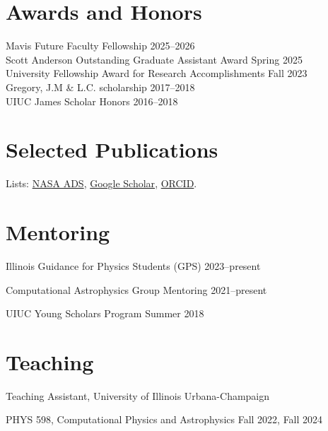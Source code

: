 \documentclass[11pt]{article}
\begin{document}
\else\fi

\section*{Awards and Honors}
Mavis Future Faculty Fellowship \hfill 2025--2026\\
Scott Anderson Outstanding Graduate Assistant Award \hfill Spring 2025\\
University Fellowship Award for Research Accomplishments \hfill Fall 2023\\
Gregory, J.M \& L.C. scholarship \hfill 2017--2018\\
UIUC James Scholar Honors \hfill 2016--2018

\section*{Selected Publications}
Lists: \href{\adslibrary}{NASA ADS}, \href{\googlescholar}{Google Scholar}, \href{https://orcid.org/0000-0002-2514-5965}{ORCID}.


\begin{etaremune}[leftmargin=1.25em]

\end{etaremune}


\section*{Mentoring}
Illinois Guidance for Physics Students (GPS) \hfill 2023--present\\

Computational Astrophysics Group Mentoring \hfill 2021--present\\

UIUC Young Scholars Program \hfill Summer 2018\\

\section*{Teaching}
Teaching Assistant, University of Illinois Urbana-Champaign

PHYS 598, Computational Physics and Astrophysics \hfill Fall 2022, Fall 2024
\end{document}
